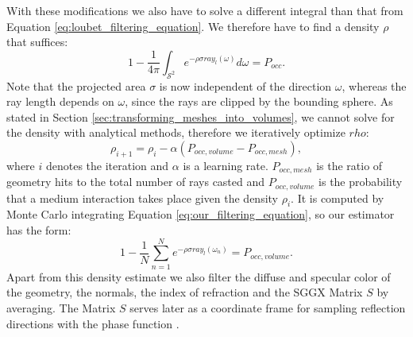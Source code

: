 With these modifications we also have to solve a different integral than that from Equation \ref{eq:loubet_filtering_equation}.
We therefore have to find a density $\rho$ that suffices:
\begin{equation}
    1 - \frac{1}{4\pi}\int_{\mathcal{S}^2} e^{-\rho\sigma ray_l(\omega)} d\omega = P_{occ}.
    \label{eq:our_filtering_equation}
\end{equation}
Note that the projected area $\sigma$ is now independent of the direction $\omega$, whereas the ray length depends on $\omega$, since the rays are clipped by the bounding sphere.
As stated in Section \ref{sec:transforming_meshes_into_volumes}, we cannot solve for the density with analytical methods, therefore we iteratively optimize $rho$:
\begin{equation*}
    \rho_{i+1}=\rho_i - \alpha (P_{occ,volume} - P_{occ,mesh}),
\end{equation*}
where $i$ denotes the iteration and $\alpha$ is a learning rate.
$P_{occ,mesh}$ is the ratio of geometry hits to the total number of rays casted and $P_{occ,volume}$ is the probability that a medium interaction takes place given the density $\rho_i$.
It is computed by Monte Carlo integrating Equation \ref{eq:our_filtering_equation}, so our estimator has the form:
\begin{equation*}
    1 - \frac{1}{N}\sum_{n=1}^{N} e^{-\rho\sigma ray_l(\omega_n)} = P_{occ,volume}.
\end{equation*}
Apart from this density estimate we also filter the diffuse and specular color of the geometry, the normals, the index of refraction and the SGGX Matrix $S$ by averaging.
The Matrix $S$ serves later as a coordinate frame for sampling reflection directions with the phase function \cite{sggx}.

